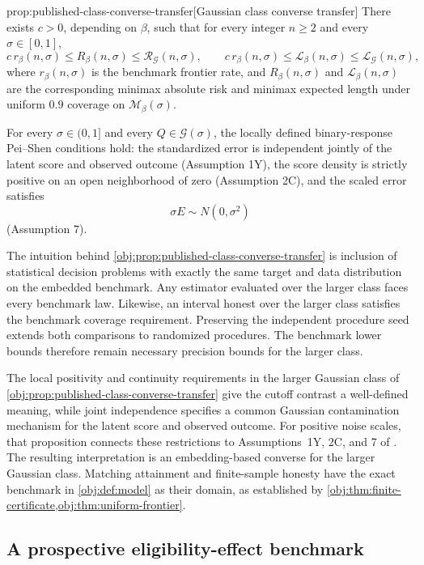 \begin{propositionv}{prop:published-class-converse-transfer}[Gaussian class converse transfer]
There exists \(c>0\), depending on \(\beta\), such that for every integer \(n\ge2\) and every \(\sigma\in[0,1]\),
\[
c\,r_\beta(n,\sigma)
\le R_\beta(n,\sigma)
\le \mathcal R_{\mathcal G}(n,\sigma),
\qquad
c\,r_\beta(n,\sigma)
\le \mathcal L_\beta(n,\sigma)
\le \mathcal L_{\mathcal G}(n,\sigma),
\]
where \(r_\beta(n,\sigma)\) is the benchmark frontier rate, and \(R_\beta(n,\sigma)\) and \(\mathcal L_\beta(n,\sigma)\) are the corresponding minimax absolute risk and minimax expected length under uniform \(0.9\) coverage on \(\mathcal M_\beta(\sigma)\).

For every \(\sigma\in(0,1]\) and every \(Q\in\mathcal G(\sigma)\), the locally defined binary-response Pei--Shen conditions hold: the standardized error is independent jointly of the latent score and observed outcome (Assumption 1Y), the score density is strictly positive on an open neighborhood of zero (Assumption 2C), and the scaled error satisfies
\[
\sigma E\sim N(0,\sigma^2)
\]
(Assumption 7).
\end{propositionv}

The intuition behind \cref{obj:prop:published-class-converse-transfer} is inclusion of statistical decision problems with exactly the same target and data distribution on the embedded benchmark. Any estimator evaluated over the larger class faces every benchmark law. Likewise, an interval honest over the larger class satisfies the benchmark coverage requirement. Preserving the independent procedure seed extends both comparisons to randomized procedures. The benchmark lower bounds therefore remain necessary precision bounds for the larger class.

The local positivity and continuity requirements in the larger Gaussian class of \cref{obj:prop:published-class-converse-transfer} give the cutoff contrast a well-defined meaning, while joint independence specifies a common Gaussian contamination mechanism for the latent score and observed outcome. For positive noise scales, that proposition connects these restrictions to Assumptions~1Y, 2C, and 7 of \citet{PeiShen2017DevilTails}. The resulting interpretation is an embedding-based converse for the larger Gaussian class. Matching attainment and finite-sample honesty have the exact benchmark in \cref{obj:def:model} as their domain, as established by \cref{obj:thm:finite-certificate,obj:thm:uniform-frontier}.

\subsection{A prospective eligibility-effect benchmark}

